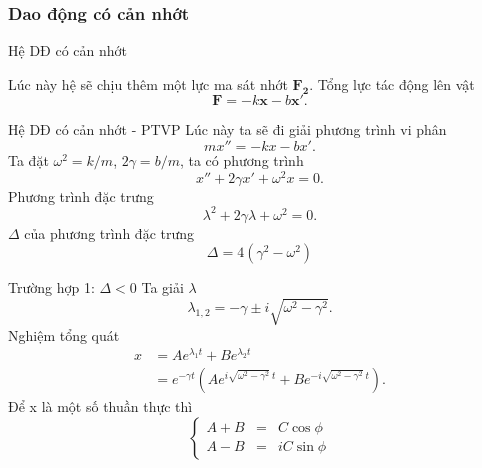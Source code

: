 \subsubsection{Dao động có cản nhớt}
\begin{frame}{Hệ DĐ có cản nhớt}
    \begin{center}
        \resizebox{0.6\linewidth}{!}{}
    \end{center}
    Lúc này hệ sẽ chịu thêm một lực ma sát nhớt \(\mathbf{F_2}\). Tổng lực tác động lên vật
    \begin{equation}
        \displaystyle \mathbf{F} =  - k \mathbf{x} - b \mathbf{x'}.
    \end{equation}
\end{frame}
\begin{frame}{Hệ DĐ có cản nhớt - PTVP}
    Lúc này ta sẽ đi giải phương trình vi phân
    \begin{equation}
        mx'' = -kx -b x'.
    \end{equation}
    Ta đặt \(\omega^2 = k/m\), \(2\gamma = b/m\), ta có phương trình
    \begin{equation*}
        x'' + 2 \gamma x' + \omega^2 x = 0.
    \end{equation*}
    Phương trình đặc trưng
    \begin{equation}
    \lambda^2 + 2 \gamma \lambda + \omega^2 = 0.
    \end{equation}
    \(\Delta\) của phương trình đặc trưng
    \begin{equation}
        \Delta = 4 (\gamma^2 -\omega^2)
    \end{equation}
\end{frame}
\begin{frame}{Trường hợp 1: \(\Delta <0\)}
    Ta giải \(\lambda\)
    \begin{equation*}
        \lambda_{1,2} =  - \gamma \pm i \sqrt{\omega^2 - \gamma^2}.
    \end{equation*}
    Nghiệm tổng quát
    \begin{equation}
    \begin{array}{cl}
    x &= A e^{\lambda_1 t} + B e^{\lambda_2 t} \\
    &= e^{-\gamma t} \left(A e^{i\sqrt{\omega^2 - \gamma^2} \ t} + B e^{- i\sqrt{\omega^2 - \gamma^2} \ t} \right).
    \end{array}
    \end{equation}
    Để x là một số thuần thực thì
    \begin{equation*}
    \left\{
    \begin{array}{ccc}
    A + B &=& C \cos \phi \\
    A - B &=& i C \sin \phi
    \end{array}
    \right.
    \end{equation*}

\end{frame}
